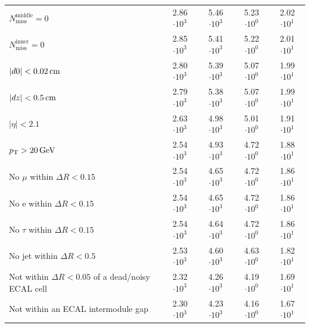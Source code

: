 \begin{table}[!h]
{\begin{tabular}{|l|c|c|c|c|}
$N_{\text{miss}}^{\text{middle}}=0$                                                       & 2.86 $\cdot10^{3 }$ & 5.46 $\cdot10^{3 }$ & 5.23 $\cdot10^{0 }$ & 2.02 $\cdot10^{1 }$ \\
$N_{\text{miss}}^{\text{inner}}=0$                                                        & 2.85 $\cdot10^{3 }$ & 5.41 $\cdot10^{3 }$ & 5.22 $\cdot10^{0 }$ & 2.01 $\cdot10^{1 }$ \\
$|d0|<0.02\,\text{cm}$                                                                            & 2.80 $\cdot10^{3 }$ & 5.39 $\cdot10^{3 }$ & 5.07 $\cdot10^{0 }$ & 1.99 $\cdot10^{1 }$ \\
$|dz|<0.5\,\text{cm}$                                                                             & 2.79 $\cdot10^{3 }$ & 5.38 $\cdot10^{3 }$ & 5.07 $\cdot10^{0 }$ & 1.99 $\cdot10^{1 }$ \\
$|\eta|<2.1$                                                                              & 2.63 $\cdot10^{3 }$ & 4.98 $\cdot10^{3 }$ & 5.01 $\cdot10^{0 }$ & 1.91 $\cdot10^{1 }$ \\
$p_{\text{T}}>20\,\text{Ge}\kern-0.06667em\text{V}$                                                                              & 2.54 $\cdot10^{3 }$ & 4.93 $\cdot10^{3 }$ & 4.72 $\cdot10^{0 }$ & 1.88 $\cdot10^{1 }$ \\
No $\mu$ within $\Delta R<0.15$                                                           & 2.54 $\cdot10^{3 }$ & 4.65 $\cdot10^{3 }$ & 4.72 $\cdot10^{0 }$ & 1.86 $\cdot10^{1 }$ \\
No e within $\Delta R<0.15$                                                               & 2.54 $\cdot10^{3 }$ & 4.65 $\cdot10^{3 }$ & 4.72 $\cdot10^{0 }$ & 1.86 $\cdot10^{1 }$ \\
No $\tau$ within $\Delta R<0.15$                                                          & 2.54 $\cdot10^{3 }$ & 4.64 $\cdot10^{3 }$ & 4.72 $\cdot10^{0 }$ & 1.86 $\cdot10^{1 }$ \\
No jet within $\Delta R<0.5$                                                              & 2.53 $\cdot10^{3 }$ & 4.60 $\cdot10^{3 }$ & 4.63 $\cdot10^{0 }$ & 1.82 $\cdot10^{1 }$ \\
\makecell[l]{Not within $\Delta R<0.05$ of \\\hfill a dead/noisy ECAL cell}               & 2.32 $\cdot10^{3 }$ & 4.26 $\cdot10^{3 }$ & 4.19 $\cdot10^{0 }$ & 1.69 $\cdot10^{1 }$ \\
Not within an ECAL  intermodule gap                                                       & 2.30 $\cdot10^{3 }$ & 4.23 $\cdot10^{3 }$ & 4.16 $\cdot10^{0 }$ & 1.67 $\cdot10^{1 }$ \\

\end{tabular}}
\end{table}

